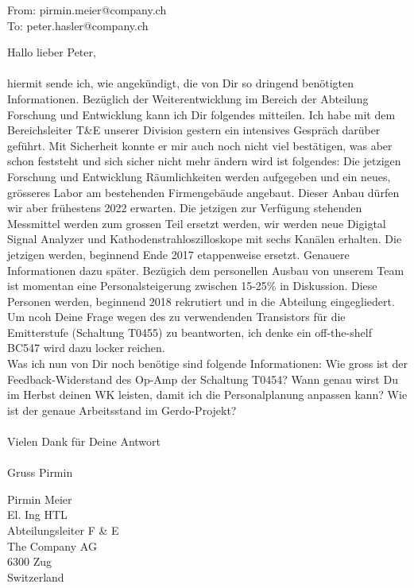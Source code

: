 From: pirmin.meier@company.ch\\
To: peter.hasler@company.ch

Hallo lieber Peter,\\\\
hiermit sende ich, wie angekündigt, die von Dir so dringend benötigten Informationen. 
Bezüglich der Weiterentwicklung im Bereich der Abteilung Forschung und Entwicklung kann ich Dir folgendes mitteilen. Ich habe mit dem Bereichsleiter T\&E unserer Division gestern ein intensives Gespräch darüber geführt. Mit Sicherheit konnte er mir auch noch nicht viel bestätigen, was aber schon feststeht und sich sicher nicht mehr ändern wird ist folgendes: Die jetzigen Forschung und Entwicklung Räumlichkeiten werden aufgegeben und ein neues, grösseres Labor am bestehenden Firmengebäude angebaut. Dieser Anbau dürfen wir aber frühestens 2022 erwarten. Die jetzigen zur Verfügung stehenden Messmittel werden zum grossen Teil ersetzt werden, wir werden neue Digigtal Signal Analyzer und Kathodenstrahloszilloskope mit sechs Kanälen erhalten. Die jetzigen werden, beginnend Ende 2017 etappenweise ersetzt. Genauere Informationen dazu später. Bezügich dem personellen Ausbau von unserem Team ist momentan eine Personalsteigerung zwischen 15-25\% in Diskussion. Diese Personen werden, beginnend 2018 rekrutiert und in die Abteilung eingegliedert.
Um ncoh Deine Frage wegen des zu verwendenden Transistors für die Emitterstufe (Schaltung T0455) zu beantworten, ich denke ein off-the-shelf BC547 wird dazu locker reichen. \\
Was ich nun von Dir noch benötige sind folgende Informationen:
Wie gross ist der Feedback-Widerstand des Op-Amp der Schaltung T0454?
Wann genau wirst Du im Herbst deinen WK leisten, damit ich die Personalplanung anpassen kann?
Wie ist der genaue Arbeitsstand im Gerdo-Projekt?\\\\
Vielen Dank für Deine Antwort\\\\
Gruss Pirmin

Pirmin Meier\\
El. Ing HTL\\
Abteilungsleiter F \& E\\
The Company AG\\
6300 Zug\\
Switzerland
   
